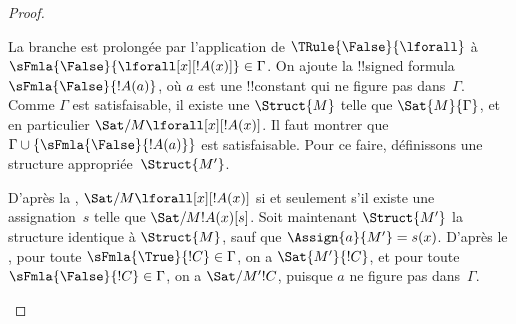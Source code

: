 \documentclass[11pt,a4paper,openany]{memoir}
\begin{document}
\begin{proof}
\begin{enumerate}
{\item La branche est prolongée par l'application de
  $\TRule{\False}{\lforall}$ à
  $\sFmla{\False}{\lforall[x][!A(x)]} \in \Gamma$. On ajoute la
  !!{signed formula}~$\sFmla{\False}{!A(a)}$, où $a$ est une
  !!{constant} qui ne figure pas dans~$\Gamma$. Comme $\Gamma$ est
  satisfaisable, il existe une $\Struct{M}$ telle que
  $\Sat{M}{\Gamma}$, et en particulier
  $\Sat/{M}{\lforall[x][!A(x)]}$. Il faut montrer que
  $\Gamma \cup \{\sFmla{\False}{!A(a)}\}$ est satisfaisable. Pour ce
  faire, définissons une structure appropriée~$\Struct{M'}$.

  D'après la ,
  $\Sat/{M}{\lforall[x][!A(x)]}$ si et seulement s'il existe une
  assignation~$s$ telle que $\Sat/{M}{!A(x)}[s]$. Soit maintenant
  $\Struct{M'}$ la structure identique à $\Struct{M}$, sauf que
  $\Assign{a}{M'} = s(x)$. D'après le
  , pour toute
  $\sFmla{\True}{!C} \in \Gamma$, on a $\Sat{M'}{!C}$, et pour toute
  $\sFmla{\False}{!C} \in \Gamma$, on a $\Sat/{M'}{!C}$, puisque $a$
  ne figure pas dans~$\Gamma$.

}
\end{enumerate}
\end{proof}
\end{document}
